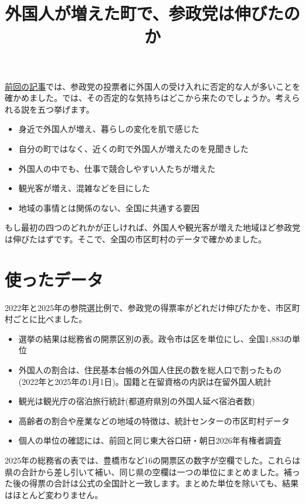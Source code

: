 \documentclass[a4paper,11pt]{ltjsarticle}
\title{外国人が増えた町で、参政党は伸びたのか}\author{}\date{}
\begin{document}
\maketitle

\href{https://note.com/good_nerine4177/n/na1c20fd7e763}{前回の記事}では、参政党の投票者に外国人の受け入れに否定的な人が多いことを確かめました。では、その否定的な気持ちはどこから来たのでしょうか。考えられる説を五つ挙げます。

\begin{itemize}[nosep]
\item 身近で外国人が増え、暮らしの変化を肌で感じた
\item 自分の町ではなく、近くの町で外国人が増えたのを見聞きした
\item 外国人の中でも、仕事で競合しやすい人たちが増えた
\item 観光客が増え、混雑などを目にした
\item 地域の事情とは関係のない、全国に共通する要因
\end{itemize}

もし最初の四つのどれかが正しければ、外国人や観光客が増えた地域ほど参政党は伸びたはずです。そこで、全国の市区町村のデータで確かめました。

\section*{使ったデータ}

2022年と2025年の参院選比例で、参政党の得票率がどれだけ伸びたかを、市区町村ごとに比べました。

\begin{itemize}[nosep]
\item 選挙の結果は総務省の開票区別の表。政令市は区を単位にし、全国1,883の単位
\item 外国人の割合は、住民基本台帳の外国人住民の数を総人口で割ったもの(2022年と2025年の1月1日)。国籍と在留資格の内訳は在留外国人統計
\item 観光は観光庁の宿泊旅行統計(都道府県別の外国人延べ宿泊者数)
\item 高齢者の割合や産業などの地域の特徴は、統計センターの市区町村データ
\item 個人の単位の確認には、前回と同じ東大谷口研・朝日2026年有権者調査
\end{itemize}

2025年の総務省の表では、豊橋市など16の開票区の数字が空欄でした。これらは県の合計から差し引いて補い、同じ県の空欄は一つの単位にまとめました。補った後の得票の合計は公式の全国計と一致します。まとめた単位を除いても、結果はほとんど変わりません。
\end{document}
